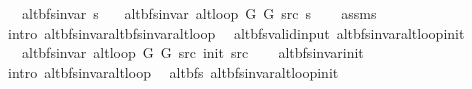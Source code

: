 \begin{isabellebody}
\ \ \ {\isachardoublequoteopen}alt{\isacharunderscore}{\kern0pt}bfs{\isacharunderscore}{\kern0pt}invar{\isacharprime}{\kern0pt}{\isacharprime}{\kern0pt}\ s{\isachardoublequoteclose}\isanewline
\ \ \ {\isachardoublequoteopen}alt{\isacharunderscore}{\kern0pt}bfs{\isacharunderscore}{\kern0pt}invar{\isacharprime}{\kern0pt}{\isacharprime}{\kern0pt}\ {\isacharparenleft}{\kern0pt}alt{\isacharunderscore}{\kern0pt}loop\ G{}\ G{}\ src\ s{\isacharparenright}{\kern0pt}{\isachardoublequoteclose}\isanewline
%
\isadelimproof
\ \ %
\endisadelimproof
%
\isatagproof
{}\isamarkupfalse%
\ assms\isanewline
\ \ \isamarkupfalse%
\ {\isacharparenleft}{\kern0pt}intro\ alt{\isacharunderscore}{\kern0pt}bfs{\isacharunderscore}{\kern0pt}invar{\isachardot}{\kern0pt}alt{\isacharunderscore}{\kern0pt}bfs{\isacharunderscore}{\kern0pt}invar{\isacharunderscore}{\kern0pt}alt{\isacharunderscore}{\kern0pt}loop{\isacharparenright}{\kern0pt}%
\endisatagproof
{\isafoldproof}%
%
\isadelimproof
\isanewline
%
\endisadelimproof
\isanewline
{}\isamarkupfalse%
\ {\isacharparenleft}{\kern0pt}\ alt{\isacharunderscore}{\kern0pt}bfs{\isacharunderscore}{\kern0pt}valid{\isacharunderscore}{\kern0pt}input{\isacharparenright}{\kern0pt}\ alt{\isacharunderscore}{\kern0pt}bfs{\isacharunderscore}{\kern0pt}invar{\isacharunderscore}{\kern0pt}alt{\isacharunderscore}{\kern0pt}loop{\isacharunderscore}{\kern0pt}init{\isacharcolon}{\kern0pt}\isanewline
\ \ \ {\isachardoublequoteopen}alt{\isacharunderscore}{\kern0pt}bfs{\isacharunderscore}{\kern0pt}invar{\isacharprime}{\kern0pt}{\isacharprime}{\kern0pt}\ {\isacharparenleft}{\kern0pt}alt{\isacharunderscore}{\kern0pt}loop\ G{}\ G{}\ src\ {\isacharparenleft}{\kern0pt}init\ src{\isacharparenright}{\kern0pt}{\isacharparenright}{\kern0pt}{\isachardoublequoteclose}\isanewline
%
\isadelimproof
\ \ %
\endisadelimproof
%
\isatagproof
{}\isamarkupfalse%
\ alt{\isacharunderscore}{\kern0pt}bfs{\isacharunderscore}{\kern0pt}invar{\isacharunderscore}{\kern0pt}init\isanewline
\ \ \isamarkupfalse%
\ {\isacharparenleft}{\kern0pt}intro\ alt{\isacharunderscore}{\kern0pt}bfs{\isacharunderscore}{\kern0pt}invar{\isacharunderscore}{\kern0pt}alt{\isacharunderscore}{\kern0pt}loop{\isacharparenright}{\kern0pt}%
\endisatagproof
{\isafoldproof}%
%
\isadelimproof
\isanewline
%
\endisadelimproof
\isanewline
{}\isamarkupfalse%
\ {\isacharparenleft}{\kern0pt}\ alt{\isacharunderscore}{\kern0pt}bfs{\isacharparenright}{\kern0pt}\ alt{\isacharunderscore}{\kern0pt}bfs{\isacharunderscore}{\kern0pt}invar{\isacharunderscore}{\kern0pt}alt{\isacharunderscore}{\kern0pt}loop{\isacharunderscore}{\kern0pt}init{\isacharcolon}{\kern0pt}\isanewline

\end{isabellebody}

